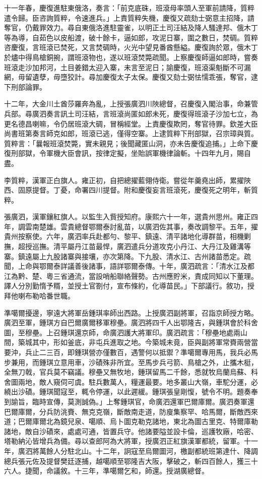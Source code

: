 \begin{pinyinscope}
十一年春，慶復進駐東俄洛，奏言：「前克底硃，班滾母率頭人至軍前請降，質粹遣令歸。臣咨詢質粹，令速進兵。」上責質粹失機，慶復又疏劾士弼意主招降，請奪官，仍戴罪效力。尋自東俄洛進駐靈雀，以明正土司汪結及降人騷達邦、俄木丁等為導，自茹色以皮船渡，破十餘卡，逼如郎，攻泥日寨，圍之數日，焚碉。質粹咨慶復，言班滾已焚死，又言焚碉時，火光中望見番酋懸縊。慶復詢於眾，俄木丁於燼中得鳥槍銅捥，謂班滾物也，遂以班滾焚斃疏聞。上察慶復師逼如郎時，嘗奏班滾走沙加邦河，土目姜錯太迎入寨，未言至泥日；諭慶復，班滾渠魁斷不可漏網，毋留遺孽，毋墮狡計。尋加慶復太子太保。慶復又劾士弼怯懦乖張，奪官，逮下刑部論罪。

十二年，大金川土酋莎羅奔為亂，上授張廣泗川陜總督，召慶復入閣治事，命兼管兵部。尋廣泗奏言訊土司汪結，言班滾尚匿如郎未死，慶復得班滾子沙加七立，為更名德昌喇嘛，令仍居班滾大碉，冒稱經堂。上責慶復欺罔，奪官待罪。欽差大臣尚書班第奏言師克如郎，班滾已逃，僅得空寨。上逮質粹下刑部獄，召宗璋與質。質粹言：「曩報班滾焚斃，實未親見；後聞藏匿山洞，亦未告慶復追捕。」上命下慶復刑部獄，令軍機大臣會訊，按律定擬，坐貽誤軍機律論斬。十四年九月，賜自盡。

李質粹，漢軍正白旗人。雍正初，自把總擢藍翎侍衛。嘗從年羹堯出師，累擢陜西、固原提督。丁憂，命署四川提督。附和慶復妄言班滾死，慶復死之明年，斬質粹。

張廣泗，漢軍鑲紅旗人。以監生入貲授知府。康熙六十一年，選貴州思州。雍正四年，調雲南楚雄。雲貴總督鄂爾泰討亂苗，以廣泗佐其事，奏改調黎平。五年，擢貴州按察使。六年，廣泗率兵赴都勻、黎平、鎮遠、清平諸地化導群苗，相機剿撫，超授巡撫。清平屬丹江苗最悍，廣泗遣兵分道攻克小丹江、大丹江及雞溝等寨。鎮遠屬上九股諸寨與接壤，亦次第降。下九股、清水江、古州諸苗悉定。疏聞，上命與鄂爾泰詳議善後諸事，語詳鄂爾泰傳。十年，廣泗疏言：「清水江及都江為黔、楚、粵三省通流，當設哨船聯絡聲勢。古州應貯米，責成同知以下董理。譯人分別勤惰予糈，並授土官劄付，宣布條約，化導苗民。」下部議行。敘功，授拜他喇布勒哈番世職。

準噶爾擾邊，寧遠大將軍岳鍾琪率師出西路。上授廣泗副將軍，召詣京師授方略。廣泗至軍，鍾琪方自巴爾廣爾移軍穆壘。廣泗將四千人出鄂隆吉，與鍾琪會於科舍圖，至穆壘。上召鍾琪還京師，命廣泗護大將軍印。廣泗疏言：「穆壘地處兩山間，築城其中，形如釜底，非屯兵進取之地。今築城未竟，臣與副將軍常賚兩營當要沖，兵止二三百，即鍾琪營亦僅數百，遇警何以抵禦？準噶爾專用馬，我兵必馬步兼用，而鍾琪立意用車，沙磧殊非所宜。至馬步兵弓箭、鳥槍之外，止攜木梃，全無刀戟，官兵莫不竊議。穆壘又無牧地，鍾琪留馬二千餘，悉就牧烏蘭烏蘇、科舍圖兩地，敵人窺伺可虞。駐兵數萬人，糧運最要。地多叢山大嶺，車駝分運，必繞出沙磧。鍾琪聞寇至，輒令停運，以此遲緩。鍾琪張皇剛愎，號令不明。題奏奉到諭旨，臨時宣傳，莫測誠偽。」上奪鍾琪官，命廣泗還軍巴爾庫爾。廣泗奏軍還巴爾庫爾，分兵防洮賚、無克克嶺，斷敵南走道，防廋集察罕、哈馬爾，斷敵西來道；巴爾庫爾北為鏡兒泉、噶順、烏卜圖克勒克諸地，東北為圖古里克、特爾庫勒諸地，敵自沙磧來，處處可通，皆置兵守。他諸要隘並設卡倫，巡護牧廠，哈密、塔勒納沁皆增兵為備。尋以查郎阿為大將軍，授廣泗正紅旗漢軍都統，留軍。十一年，廣泗將萬餘人分駐北山。十二年，詗寇至烏爾圖河，檄副都統班第達什、降調總兵張元佐及提督樊廷逐捕，越噶順至鄂隆吉大阪，擊破之，斬四百餘人，獲三十六人。捷聞，命議敘。十三年，準噶爾乞和，師還。授湖廣總督。


\end{pinyinscope}
